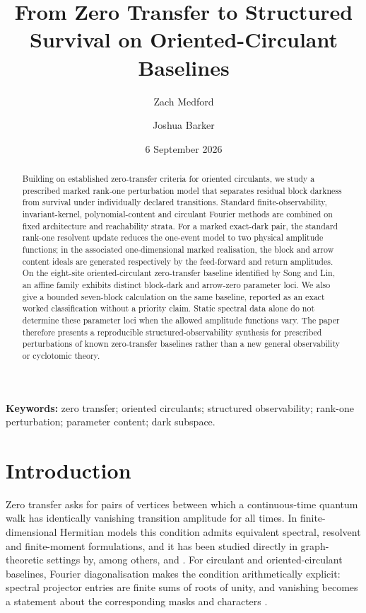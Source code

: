 \documentclass[11pt]{article}
\title{\textbf{From Zero Transfer to Structured Survival on Oriented-Circulant Baselines}}
\author{Zach Medford \and Joshua Barker}
\date{6 September 2026}
\theoremstyle{definition}
\theoremstyle{remark}
\begin{document}
\maketitle

\begin{abstract}
Building on established zero-transfer criteria for oriented circulants, we study a prescribed marked rank-one perturbation model that separates residual block darkness from survival under individually declared transitions. Standard finite-observability, invariant-kernel, polynomial-content and circulant Fourier methods are combined on fixed architecture and reachability strata. For a marked exact-dark pair, the standard rank-one resolvent update reduces the one-event model to two physical amplitude functions; in the associated one-dimensional marked realisation, the block and arrow content ideals are generated respectively by the feed-forward and return amplitudes. On the eight-site oriented-circulant zero-transfer baseline identified by Song and Lin, an affine family exhibits distinct block-dark and arrow-zero parameter loci. We also give a bounded seven-block calculation on the same baseline, reported as an exact worked classification without a priority claim. Static spectral data alone do not determine these parameter loci when the allowed amplitude functions vary. The paper therefore presents a reproducible structured-observability synthesis for prescribed perturbations of known zero-transfer baselines rather than a new general observability or cyclotomic theory.
\end{abstract}

\noindent\textbf{Keywords:} zero transfer; oriented circulants; structured observability; rank-one perturbation; parameter content; dark subspace.

\section{Introduction}

Zero transfer asks for pairs of vertices between which a continuous-time quantum walk has identically vanishing transition amplitude for all times. In finite-dimensional Hermitian models this condition admits equivalent spectral, resolvent and finite-moment formulations, and it has been studied directly in graph-theoretic settings by, among others, \textcite{Sett2019} and \textcite{SongLin2026}. For circulant and oriented-circulant baselines, Fourier diagonalisation makes the condition arithmetically explicit: spectral projector entries are finite sums of roots of unity, and vanishing becomes a statement about the corresponding masks and characters \parencite{SongLin2026,SongPST2026}.
\end{document}
